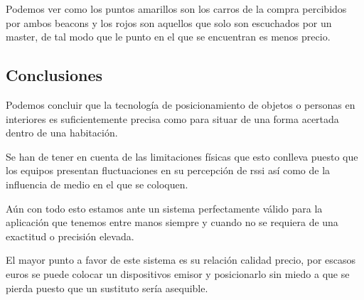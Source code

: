 \documentclass[a4paper ,12pt, onecolumn]{article}
\begin{document}
            Podemos ver como los puntos amarillos son los carros de la compra percibidos por ambos beacons y los rojos son aquellos
            que solo son escuchados por un master, de tal modo que le punto en el que se encuentran es menos precio.
    \subsection{Conclusiones}
        Podemos concluir que la tecnología de posicionamiento de objetos o personas en interiores es suficientemente precisa como para 
        situar de una forma acertada dentro de una habitación.
        
        Se han de tener en cuenta de las limitaciones físicas que esto conlleva puesto
        que los equipos presentan fluctuaciones en su percepción de rssi así como de la influencia de medio en el que se coloquen.

        Aún con todo esto estamos ante un sistema perfectamente válido para la aplicación que tenemos entre manos siempre y cuando no se requiera de una
        exactitud o precisión elevada. 

        El mayor punto a favor de este sistema es su relación calidad precio, por escasos euros se puede colocar un dispositivos emisor y posicionarlo 
        sin miedo a que se pierda puesto que un sustituto sería asequible.
\end{document}
